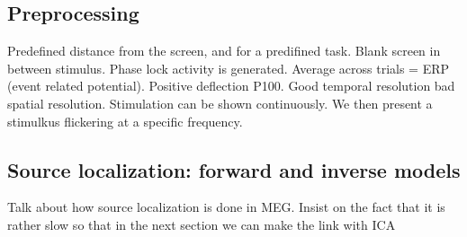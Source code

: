 \subsection{Preprocessing}
Predefined distance from the screen, and for a predifined task. Blank screen in
between stimulus. Phase lock activity  is generated. Average across trials = ERP
(event related potential). Positive deflection P100.
Good temporal resolution bad spatial resolution.
Stimulation can be shown continuously. We then present a stimulkus flickering at
a specific frequency.
\subsection{Source localization: forward and inverse models}
Talk about how source localization is done in MEG. Insist on the fact that it is
rather slow so that in the next section we can make the link with ICA
